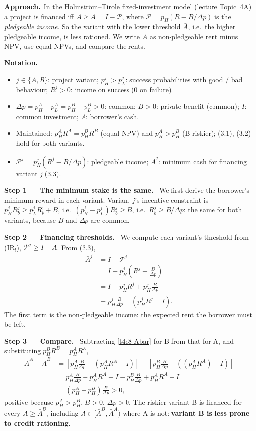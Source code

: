 \documentclass[11pt,a4paper]{article}
\newcommand{\notation}{\par\noindent\textbf{Notation.}}
\newcommand{\step}[2]{\par\medskip\noindent\textbf{Step #1 --- #2.}~}
\newcommand{\approach}{\par\smallskip\noindent\textbf{Approach.}~}
\begin{document}
\approach In the Holmstr\"om--Tirole fixed-investment model (lecture Topic~4A) a project is
financed iff $A\ge\bar A=I-\mathcal P$, where $\mathcal P=p_H(R-B/\Delta p)$ is the
\emph{pledgeable income}. So the variant with the lower threshold $\bar A$, i.e.\ the higher
pledgeable income, is less rationed. We write $\bar A$ as non-pledgeable rent minus NPV, use equal
NPVs, and compare the rents.

\notation
\begin{itemize}
  \item $j\in\{A,B\}$: project variant; $p_H^j>p_L^j$: success probabilities with good / bad behaviour; $R^j>0$: income on success (0 on failure).
  \item $\Delta p=p_H^A-p_L^A=p_H^B-p_L^B>0$: common; $B>0$: private benefit (common); $I$: common investment; $A$: borrower's cash.
  \item Maintained: $p_H^A R^A=p_H^B R^B$ (equal NPV) and $p_H^A>p_H^B$ (B riskier); (3.1), (3.2) hold for both variants.
  \item $\mathcal P^j=p_H^j(R^j-B/\Delta p)$: pledgeable income; $\bar A^j$: minimum cash for financing variant $j$ (3.3).
\end{itemize}

\step{1}{The minimum stake is the same} We first derive the borrower's minimum reward in each
variant. Variant $j$'s incentive constraint is $p_H^jR_b^j\ge p_L^jR_b^j+B$, i.e.\
$(p_H^j-p_L^j)R_b^j\ge B$, i.e.\ $R_b^j\ge B/\Delta p$: the same for both variants, because $B$ and
$\Delta p$ are common.

\step{2}{Financing thresholds} We compute each variant's threshold from (IR$_l$),
$\mathcal P^j\ge I-A$. From (3.3),
\begin{align}
  \bar A^j &= I-\mathcal P^j \nonumber\\
           &= I-p_H^j\left(R^j-\frac{B}{\Delta p}\right) \nonumber\\
           &= I-p_H^jR^j+p_H^j\frac{B}{\Delta p} \nonumber\\
           &= p_H^j\frac{B}{\Delta p}-(p_H^j R^j-I). \label{t4e8-Abar}
\end{align}
The first term is the non-pledgeable income: the expected rent the borrower must be left.

\step{3}{Compare} Subtracting \eqref{t4e8-Abar} for B from that for A, and substituting
$p_H^B R^B=p_H^A R^A$,
\begin{align}
  \bar A^A-\bar A^B &= \left[p_H^A\frac{B}{\Delta p}-(p_H^A R^A-I)\right]-\left[p_H^B\frac{B}{\Delta p}-((p_H^A R^A)-I)\right] \nonumber\\
                    &= p_H^A\frac{B}{\Delta p}-p_H^AR^A+I-p_H^B\frac{B}{\Delta p}+p_H^AR^A-I \nonumber\\
                    &= (p_H^A-p_H^B)\frac{B}{\Delta p} > 0, \label{t4e8-diff}
\end{align}
positive because $p_H^A>p_H^B$, $B>0$, $\Delta p>0$. The riskier variant B is financed for every
$A\ge\bar A^B$, including $A\in[\bar A^B,\bar A^A)$ where A is not: \textbf{variant B is less prone
to credit rationing}.
\end{document}
